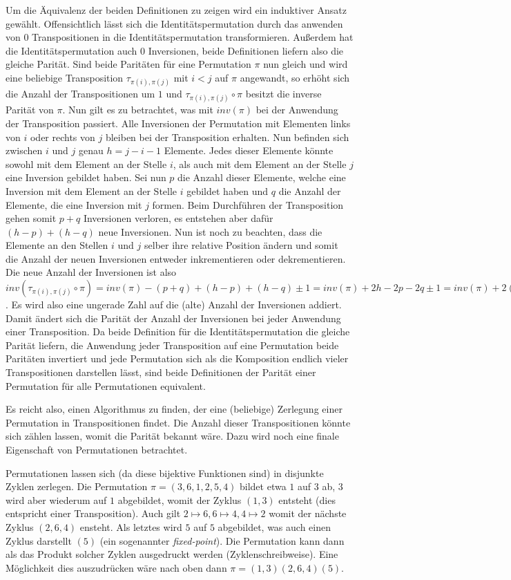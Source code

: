 \documentclass{whswinvcbook}
\begin{document}
Um die Äquivalenz der beiden Definitionen zu zeigen wird ein induktiver Ansatz gewählt. Offensichtlich lässt sich die Identitätspermutation durch das anwenden von $0$ Transpositionen in die Identitätspermutation transformieren. Außerdem hat die Identitätspermutation auch $0$ Inversionen, beide Definitionen liefern also die gleiche Parität. Sind beide Paritäten für eine Permutation $\pi$ nun gleich und wird eine beliebige Transposition $\tau_{\pi(i),\pi(j)}$ mit $i<j$ auf $\pi$ angewandt, so erhöht sich die Anzahl der Transpositionen um $1$ und $\tau_{\pi(i),\pi(j)}\circ\pi$ besitzt die inverse Parität von $\pi$. Nun gilt es zu betrachtet, was mit $inv(\pi)$ bei der Anwendung der Transposition passiert. Alle Inversionen der Permutation mit Elementen links von $i$ oder rechts von $j$ bleiben bei der Transposition erhalten. Nun befinden sich zwischen $i$ und $j$ genau $h=j-i-1$ Elemente. Jedes dieser Elemente könnte sowohl mit dem Element an der Stelle $i$, als auch mit dem Element an der Stelle $j$ eine Inversion gebildet haben. Sei nun $p$ die Anzahl dieser Elemente, welche eine Inversion mit dem Element an der Stelle $i$ gebildet haben und $q$ die Anzahl der Elemente, die eine Inversion mit $j$ formen. Beim Durchführen der Transposition gehen somit $p+q$ Inversionen verloren, es entstehen aber dafür $(h-p)+(h-q)$ neue Inversionen. Nun ist noch zu beachten, dass die Elemente an den Stellen $i$ und $j$ selber ihre relative Position ändern und somit die Anzahl der neuen Inversionen entweder inkrementieren oder dekrementieren. Die neue Anzahl der Inversionen ist also $inv(\tau_{\pi(i),\pi(j)}\circ\pi)=inv(\pi)-(p+q)+(h-p)+(h-q)\pm1=inv(\pi)+2h-2p-2q\pm1=inv(\pi)+2(h-p-q)\pm1$. Es wird also eine ungerade Zahl auf die (alte) Anzahl der Inversionen addiert. Damit ändert sich die Parität der Anzahl der Inversionen bei jeder Anwendung einer Transposition. Da beide Definition für die Identitätspermutation die gleiche Parität liefern, die Anwendung jeder Transposition auf eine Permutation beide Paritäten invertiert und jede Permutation sich als die Komposition endlich vieler Transpositionen darstellen lässt, sind beide Definitionen der Parität einer Permutation für alle Permutationen equivalent.

Es reicht also, einen Algorithmus zu finden, der eine (beliebige) Zerlegung einer Permutation in Transpositionen findet. Die Anzahl dieser Transpositionen könnte sich zählen lassen, womit die Parität bekannt wäre. Dazu wird noch eine finale Eigenschaft von Permutationen betrachtet.

Permutationen lassen sich (da diese bijektive Funktionen sind) in disjunkte Zyklen zerlegen. Die Permutation $\pi=(3,6,1,2,5,4)$ bildet etwa $1$ auf $3$ ab, $3$ wird aber wiederum auf $1$ abgebildet, womit der Zyklus $(1,3)$ entsteht (dies entspricht einer Transposition). Auch gilt $2\mapsto6,6\mapsto4,4\mapsto2$ womit der nächste Zyklus $(2,6,4)$ ensteht. Als letztes wird $5$ auf $5$ abgebildet, was auch einen Zyklus darstellt $(5)$ (ein sogenannter \textit{fixed-point}). Die Permutation kann dann als das Produkt solcher Zyklen ausgedruckt werden (Zyklenschreibweise). Eine Möglichkeit dies auszudrücken wäre nach oben dann $\pi=(1,3)(2,6,4)(5)$.
\end{document}
